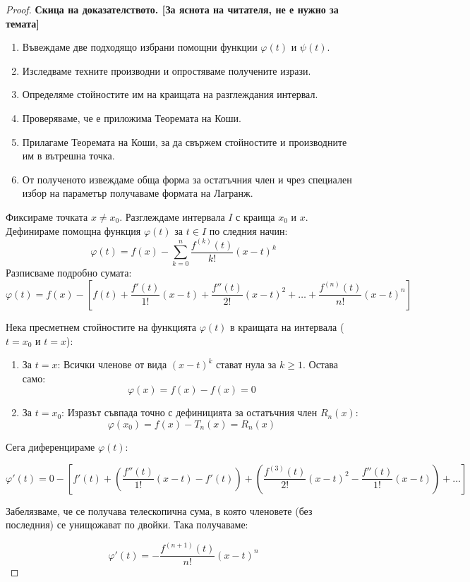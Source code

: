 \documentclass{scrartcl}
\begin{document}
\begin{FlushLeft}
\begin{proof}
\textbf{Скица на доказателството. [За яснота на читателя, не е нужно за темата]}
\begin{enumerate}
    \item Въвеждаме две подходящо избрани помощни функции $\varphi(t)$ и $\psi(t)$.
    \item Изследваме техните производни и опростяваме получените изрази.
    \item Определяме стойностите им на краищата на разглеждания интервал.
    \item Проверяваме, че е приложима Теоремата на Коши.
    \item Прилагаме Теоремата на Коши, за да свържем стойностите и производните им в вътрешна точка.
    \item От полученото извеждаме обща форма за остатъчния член и чрез специален избор на параметър получаваме формата на Лагранж.
\end{enumerate}

Фиксираме точката $x \neq x_0$. Разглеждаме интервала $I$ с краища $x_0$ и $x$. Дефинираме помощна функция $\varphi(t)$ за $t \in I$ по следния начин:
\[ \varphi(t) = f(x) - \sum_{k=0}^{n} \frac{f^{(k)}(t)}{k!}(x - t)^k \]
Разписваме подробно сумата:
\[ \varphi(t) = f(x) - \left[ f(t) + \frac{f'(t)}{1!}(x - t) + \frac{f''(t)}{2!}(x - t)^2 + \dots + \frac{f^{(n)}(t)}{n!}(x - t)^n \right] \]

Нека пресметнем стойностите на функцията $\varphi(t)$ в краищата на интервала ($t = x_0$ и $t = x$):
\begin{enumerate}
    \item За $t = x$: Всички членове от вида $(x - t)^k$ стават нула за $k \ge 1$. Остава само:
    \[ \varphi(x) = f(x) - f(x) = 0 \]
    \item За $t = x_0$: Изразът съвпада точно с дефиницията за остатъчния член $R_n(x)$:
    \[ \varphi(x_0) = f(x) - T_n(x) = R_n(x) \]
\end{enumerate}

Сега диференцираме $\varphi(t)$:

\[ \varphi'(t) = 0 - \left[ f'(t) + \left( \frac{f''(t)}{1!}(x-t) - f'(t) \right) + \left( \frac{f^{(3)}(t)}{2!}(x-t)^2 - \frac{f''(t)}{1!}(x-t) \right) + \dots \right] \]

Забелязваме, че се получава телескопична сума, в която членовете (без последния) се унищожават по двойки. Така получаваме:

\[ \varphi'(t) = -\frac{f^{(n+1)}(t)}{n!}(x - t)^n \]


\end{proof}
\end{FlushLeft}
\end{document}
